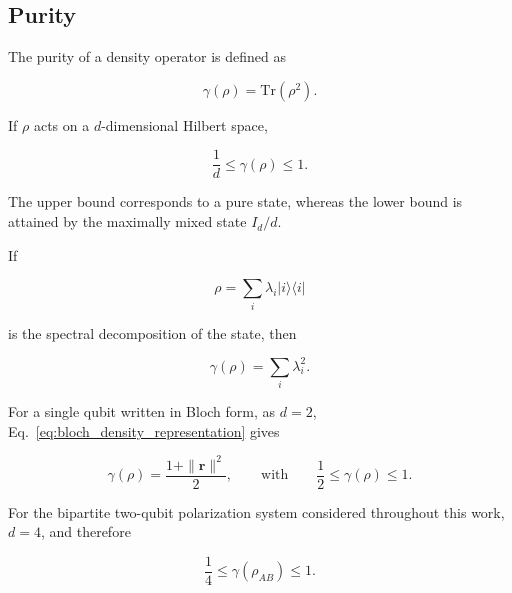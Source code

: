
\subsection{Purity}
\label{subsec:purity}

The purity of a density operator is defined as

\begin{equation}
\gamma(\rho)
=
\mathrm{Tr}(\rho^2).
\label{eq:purity_definition}
\end{equation}

If \( \rho \) acts on a \(d\)-dimensional Hilbert space,

\begin{equation}
\frac{1}{d}
\leq
\gamma(\rho)
\leq
1.
\label{eq:purity_bounds}
\end{equation}

The upper bound corresponds to a pure state, whereas the lower bound is attained
by the maximally mixed state \(I_d/d\).

If

\begin{equation}
\rho
=
\sum_i
\lambda_i
|i\rangle\langle i|
\label{eq:spectral_decomposition_state}
\end{equation}

is the spectral decomposition of the state, then

\begin{equation}
\gamma(\rho)
=
\sum_i \lambda_i^2.
\label{eq:purity_spectral_decomposition}
\end{equation}

For a single qubit written in Bloch form, as \(d=2\),
Eq.~\eqref{eq:bloch_density_representation} gives

\begin{equation}
\gamma(\rho)
=
\frac{1+\|\mathbf{r}\|^2}{2},
\qquad
\text{with}
\qquad
\frac{1}{2}
\leq
\gamma(\rho)
\leq
1.
\label{eq:single_qubit_purity_bloch}
\end{equation}

For the bipartite two-qubit polarization system considered throughout this work, \(d=4\),
and therefore

\begin{equation}
\frac{1}{4}
\leq
\gamma(\rho_{AB})
\leq
1.
\label{eq:two_qubit_purity_bounds}
\end{equation}

